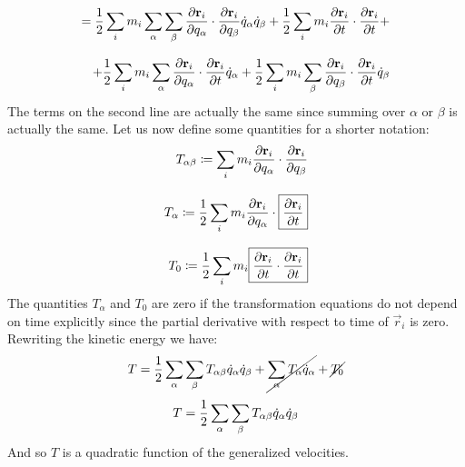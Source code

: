 \begin{equation}
    \begin{split}
        = \dfrac{1}{2}\displaystyle\sum_i m_i \displaystyle\sum_{\alpha}\displaystyle\sum_{\beta}\dfrac{\partial \vb{r}_i}{\partial q_{\alpha}}\cdot\dfrac{\partial \vb{r}_i}{\partial q_{\beta}}\dot{q}_{\alpha}\dot{q}_{\beta} + \dfrac{1}{2}\displaystyle\sum_i m_i \dfrac{\partial \vb{r}_i}{\partial t} \cdot \dfrac{\partial \vb{r}_i}{\partial t} +\\[8pt]
        + \dfrac{1}{2}\displaystyle\sum_i m_i \displaystyle\sum_{\alpha}\dfrac{\partial \vb{r}_i}{\partial q_{\alpha}} \cdot \dfrac{\partial \vb{r}_i}{\partial t} \dot{q}_{\alpha} + \dfrac{1}{2}\displaystyle\sum_i m_i \displaystyle\sum_{\beta}\dfrac{\partial \vb{r}_i}{\partial q_{\beta}} \cdot \dfrac{\partial \vb{r}_i}{\partial t}\dot{q}_{\beta}
    \end{split}
\end{equation}
The terms on the second line are actually the same since summing over $\alpha$ or $\beta$ is actually the same. Let us now define some quantities for a shorter notation:
\begin{equation}
    \begin{split}
        T_{\alpha \beta} \coloneqq \displaystyle\sum_i m_i \dfrac{\partial \vb{r}_i}{\partial q_{\alpha}}\cdot\dfrac{\partial \vb{r}_i}{\partial q_{\beta}}\\[8pt]
        T_{\alpha} \coloneqq \dfrac{1}{2} \displaystyle\sum_i m_i \dfrac{\partial \vb{r}_i}{\partial q_{\alpha}} \cdot \boxed{\dfrac{\partial \vb{r}_i}{\partial t}}\\[8pt]
        T_0 \coloneqq \dfrac{1}{2}\displaystyle\sum_i m_i \boxed{\dfrac{\partial \vb{r}_i}{\partial t} \cdot \dfrac{\partial \vb{r}_i}{\partial t}}
    \end{split}
\end{equation}
The quantities $T_{\alpha}$ and $T_0$ are zero if the transformation equations do not depend on time explicitly since the partial derivative with respect to time of $\vec{r}_i$ is zero. Rewriting the kinetic energy we have:
\begin{equation}
    T = \dfrac{1}{2}\displaystyle\sum_{\alpha}\displaystyle\sum_{\beta}T_{\alpha \beta}\dot{q}_{\alpha}\dot{q}_{\beta} + \cancel{\displaystyle\sum_{\alpha}T_{\alpha}\dot{q}_{\alpha}} + \cancel{T_0}
\end{equation}
\begin{equation} \label{e:kinetic_energy}
    T = \dfrac{1}{2}\displaystyle\sum_{\alpha}\displaystyle\sum_{\beta}T_{\alpha \beta}\dot{q}_{\alpha}\dot{q}_{\beta}
\end{equation}
And so $T$ is a quadratic function of the generalized velocities.\\
